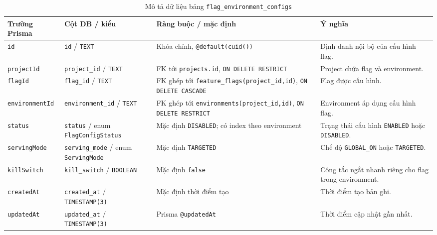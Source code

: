 \begin{table}[H]
    \centering
    \caption{Mô tả dữ liệu bảng \texttt{flag\_environment\_configs}}
    \label{tab:db-flag-environment-configs}
    \begingroup
    \singlespacing
    \scriptsize
    \setlength{\tabcolsep}{3pt}
    \renewcommand{\arraystretch}{1.12}
    \begin{tabular}{p{} p{} p{} p{}}
        \toprule
        \textbf{Trường Prisma} & \textbf{Cột DB / kiểu} & \textbf{Ràng buộc / mặc định} & \textbf{Ý nghĩa} \\
        \midrule
        \texttt{id} & \texttt{id} / \texttt{TEXT} & Khóa chính, \texttt{@default(cuid())} & Định danh nội bộ của cấu hình flag. \\
        \texttt{projectId} & \texttt{project\_id} / \texttt{TEXT} & FK tới \texttt{projects.id}, \texttt{ON DELETE RESTRICT} & Project chứa flag và environment. \\
        \texttt{flagId} & \texttt{flag\_id} / \texttt{TEXT} & FK ghép tới \texttt{feature\_flags(project\_id,id)}, \texttt{ON DELETE CASCADE} & Flag được cấu hình. \\
        \texttt{environmentId} & \texttt{environment\_id} / \texttt{TEXT} & FK ghép tới \texttt{environments(project\_id,id)}, \texttt{ON DELETE RESTRICT} & Environment áp dụng cấu hình flag. \\
        \texttt{status} & \texttt{status} / enum \texttt{FlagConfigStatus} & Mặc định \texttt{DISABLED}; có index theo environment & Trạng thái cấu hình \texttt{ENABLED} hoặc \texttt{DISABLED}. \\
        \texttt{servingMode} & \texttt{serving\_mode} / enum \texttt{ServingMode} & Mặc định \texttt{TARGETED} & Chế độ \texttt{GLOBAL\_ON} hoặc \texttt{TARGETED}. \\
        \texttt{killSwitch} & \texttt{kill\_switch} / \texttt{BOOLEAN} & Mặc định \texttt{false} & Công tắc ngắt nhanh riêng cho flag trong environment. \\
        \texttt{createdAt} & \texttt{created\_at} / \texttt{TIMESTAMP(3)} & Mặc định thời điểm tạo & Thời điểm tạo bản ghi. \\
        \texttt{updatedAt} & \texttt{updated\_at} / \texttt{TIMESTAMP(3)} & Prisma \texttt{@updatedAt} & Thời điểm cập nhật gần nhất. \\
        \bottomrule
    \end{tabular}
    \endgroup
\end{table}


